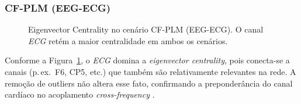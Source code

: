 \subsubsection{CF-PLM (EEG-ECG)}
\begin{figure}[htb]
    \centering
    \quad
    \caption{Eigenvector Centrality no cenário CF-PLM (EEG-ECG). O canal \emph{ECG} retém a maior centralidade em ambos os cenários.}
    \label{fig:ec_cfplm_eegecg}
\end{figure}

Conforme a Figura~\ref{fig:ec_cfplm_eegecg}, o \emph{ECG} domina a \emph{eigenvector centrality}, pois conecta-se a canais (p.\,ex.\ F6, CP5, etc.) que também são relativamente relevantes na rede. A remoção de outliers não altera esse fato, confirmando a preponderância do canal cardíaco no acoplamento \emph{cross-frequency} \cite{bullmore2009complex}.

